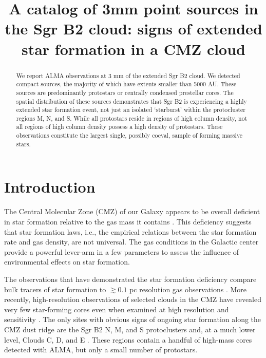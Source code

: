 \documentclass[twocolumn]{aastex61}
\begin{document}
\title{A catalog of 3mm point sources in the Sgr B2 cloud: signs of extended star formation in a CMZ cloud}

\begin{abstract}
We report ALMA observations at 3 mm  of the extended Sgr B2 cloud. We detected
\ncores compact sources, the majority of which have extents 
smaller than 5000 AU.  These sources are predominantly protostars or
centrally condensed prestellar cores.  The spatial distribution of these sources
demonstrates that Sgr B2 is experiencing a highly extended star formation
event, not just an isolated `starburst' within the protocluster regions M, N,
and S.  While all protostars reside in regions of high column density, not all
regions of high column density possess a high density of protostars.  
These observations constitute the largest single, possibly coeval, sample of
forming massive stars.
\end{abstract}


\section{Introduction}
The Central Molecular Zone (CMZ) of our Galaxy appears to be overall deficient
in star formation relative to the gas mass it contains \citep{Longmore2013a,
Kauffmann2016a,Kauffmann2016b,Barnes2016c,Barnes2017b}.  This deficiency
suggests that star formation laws, i.e., the empirical relations between
the star formation rate and gas density, are not universal.  The gas
conditions in the Galactic center provide a powerful lever-arm in a few
parameters \citep[e.g., pressure, temperature, velocity
dispersion][]{Ginsburg2016a,Immer2016a,Shetty2012a,Henshaw2016a} to assess the
influence of environmental effects on star formation.

The observations that have demonstrated the star formation deficiency compare
bulk tracers of star formation to $\gtrsim0.1$ pc resolution gas observations
\citep[e.g.]{Barnes2017b}.  More recently, high-resolution observations
of selected clouds in the CMZ have revealed very few star-forming cores
even when examined at high resolution and sensitivity
\citep{Rathborne2015a,Kauffmann2016a,Kauffmann2016b}.  The only sites with
obvious signs of ongoing star formation along the CMZ dust ridge are
the Sgr B2 N, M, and S protoclusters \citep{Schmiedeke2016a} and, at a much
lower level, Clouds C, D, and E \citep[][Walker et al, in prep; Barnes et al,
in prep]{Ginsburg2015b}.  These regions contain a handful of high-mass cores
detected with ALMA, but only a small number of protostars.
\end{document}
